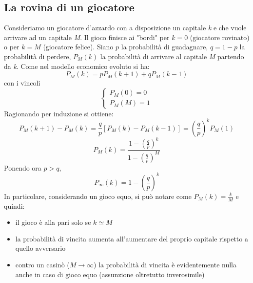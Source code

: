 \documentclass[12pt, a4paper]{article}
\theoremstyle{theorem}
\begin{document}
		\subsection{La rovina di un giocatore}
			Consideriamo un giocatore d'azzardo con a disposizione un capitale \textit{k} e che vuole arrivare ad un capitale \textit{M}.
			Il gioco finisce ai "bordi" per $k=0$ (giocatore rovinato) o per $k=M$ (giocatore felice).
			Siano $p$ la probabilità di guadagnare, $q=1-p$ la probabilità di perdere, $P_M(k)$ la probabilità di arrivare al capitale \textit{M} partendo da \textit{k}.
			Come nel modello economico evoluto si ha:
			\begin{equation}
				P_M(k)=pP_M(k+1)+qP_M(k-1)
			\end{equation}
			con i vincoli
			\begin{equation}
				\begin{cases}
					P_M(0)=0\\
					P_M(M)=1
				\end{cases}
			\end{equation}
			Ragionando per induzione si ottiene:
			\begin{equation}
				P_M(k+1)-P_M(k)=\frac{q}{p}\left[P_M(k)-P_M(k-1)\right]=\left(\frac{q}{p}\right)^kP_M(1)
			\end{equation}
			\begin{equation}
				P_M(k)=\frac{1-\left(\frac{q}{p}\right)^k}{1-\left(\frac{q}{p}\right)^M}
			\end{equation}
			Ponendo ora $p>q$,
			\begin{equation}
				P_\infty(k)=1-\left(\frac{q}{p}\right)^k
			\end{equation}
			In particolare, considerando un gioco equo, si può notare come $P_M(k)=\frac{k}{M}$ e quindi:
			\begin{itemize}
				\item il gioco è alla pari solo se $k\simeq M$
				\item la probabilità di vincita aumenta all'aumentare del proprio capitale rispetto a quello avversario
				\item contro un casinò ($M\to\infty$) la probabilità di vincita è evidentemente nulla anche in caso di gioco equo (assunzione oltretutto inverosimile)
			\end{itemize}
			
\end{document}
